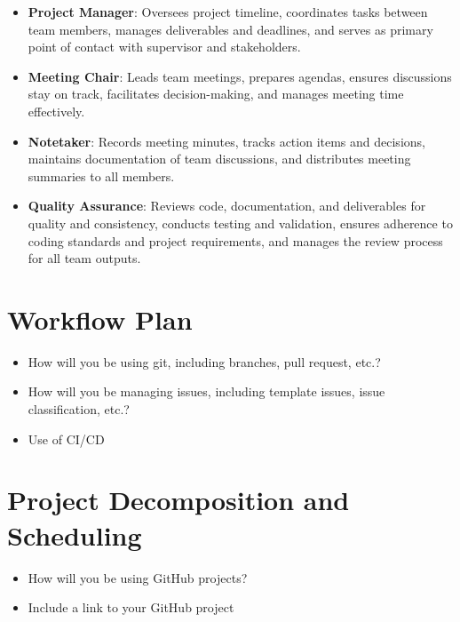 \documentclass{article}
\begin{document}
\begin{itemize}
  \item \textbf{Project Manager}: Oversees project timeline, coordinates tasks between team members, manages deliverables and deadlines, and serves as primary point of contact with supervisor and stakeholders.
  \item \textbf{Meeting Chair}: Leads team meetings, prepares agendas, ensures discussions stay on track, facilitates decision-making, and manages meeting time effectively.
  \item \textbf{Notetaker}: Records meeting minutes, tracks action items and decisions, maintains documentation of team discussions, and distributes meeting summaries to all members.
  \item \textbf{Quality Assurance}: Reviews code, documentation, and deliverables for quality and consistency, conducts testing and validation, ensures adherence to coding standards and project requirements, and manages the review process for all team outputs.
\end{itemize}

\section{Workflow Plan}

\begin{itemize}
  \item How will you be using git, including branches, pull request, etc.?
  \item How will you be managing issues, including template issues, issue
        classification, etc.?
  \item Use of CI/CD
\end{itemize}

\section{Project Decomposition and Scheduling}

\begin{itemize}
  \item How will you be using GitHub projects?
  \item Include a link to your GitHub project
\end{itemize}

\end{document}
